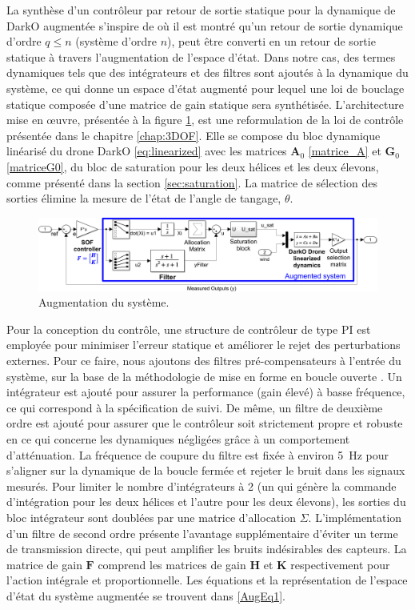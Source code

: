 La synthèse d'un contrôleur par retour de sortie statique pour la dynamique de DarkO augmentée s'inspire de \cite{SYRMOS1997125} où il est montré qu'un retour de sortie dynamique d'ordre $q \leq n$ (système d'ordre $n$), peut être converti en un retour de sortie statique à travers l'augmentation de l'espace d'état. Dans notre cas, des termes dynamiques tels que des intégrateurs et des filtres sont ajoutés à la dynamique du système, ce qui donne un espace d'état augmenté pour lequel une loi de bouclage statique composée d'une matrice de gain statique sera synthétisée. L'architecture mise en œuvre, présentée à la figure \ref{Plant Augmentation}, est une reformulation de la loi de contrôle présentée dans le chapitre \ref{chap:3DOF}. Elle se compose du bloc dynamique linéarisé du drone DarkO \eqref{eq:linearized} avec les matrices $\boldsymbol{A}_{0}$ \eqref{matrice_A} et $\boldsymbol{G}_{0}$ \eqref{matriceG0}, du bloc de saturation pour les deux hélices et les deux élevons, comme présenté dans la section \ref{sec:saturation}. La matrice de sélection des sorties élimine la mesure de l'état de l'angle de tangage, $\theta$.

\begin{figure}[hbt]
    \centering
    \includegraphics[width=0.9\columnwidth]{figures/AugWindFinal.png}
    \vspace{-0.3cm}\caption{Augmentation du système.}
    \label{Plant Augmentation}
\end{figure}


Pour la conception du contrôle, une structure de contrôleur de type PI est employée pour minimiser l'erreur statique et améliorer le rejet des perturbations externes. Pour ce faire, nous ajoutons des filtres pré-compensateurs à l'entrée du système, sur la base de la méthodologie de mise en forme en boucle ouverte \cite{McFarlane1992}. Un intégrateur est ajouté pour assurer la performance (gain élevé) à basse fréquence, ce qui correspond à la spécification de suivi. De même, un filtre de deuxième ordre est ajouté pour assurer que le contrôleur soit strictement propre et robuste en ce qui concerne les dynamiques négligées grâce à un comportement d'atténuation. La fréquence de coupure du filtre est fixée à environ \SI{5}{\hertz} pour s'aligner sur la dynamique de la boucle fermée et rejeter le bruit dans les signaux mesurés. Pour limiter le nombre d'intégrateurs à 2 (un qui génère la commande d'intégration pour les deux hélices et l'autre pour les deux élevons), les sorties du bloc intégrateur sont doublées par une matrice d'allocation $\Sigma$. L'implémentation d'un filtre de second ordre présente l'avantage supplémentaire d'éviter un terme de transmission directe, qui peut amplifier les bruits indésirables des capteurs. La matrice de gain $\boldsymbol{F}$ comprend les matrices de gain $\boldsymbol{H}$ et $\boldsymbol{K}$ respectivement pour l'action intégrale et proportionnelle. Les équations et la représentation de l'espace d'état du système augmentée se trouvent dans \eqref{AugEq1}.

